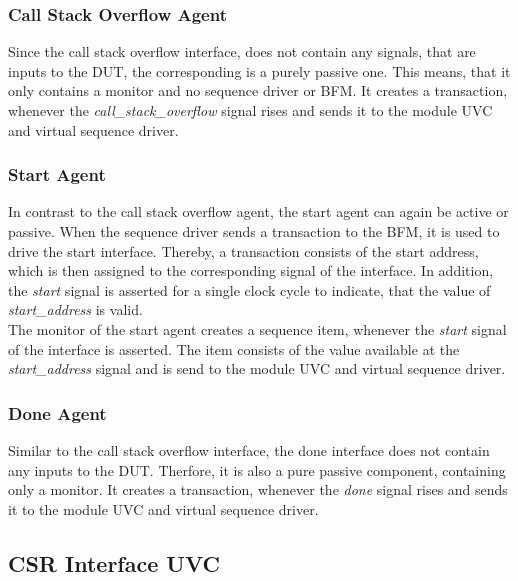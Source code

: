 \subsubsection{Call Stack Overflow Agent}

Since the call stack overflow interface, does not contain any signals, that are inputs to the DUT, the corresponding is a purely passive one.
This means, that it only contains a monitor and no sequence driver or BFM.
It creates a transaction, whenever the \emph{call\_stack\_overflow} signal rises and sends it to the module UVC and virtual sequence driver.

\subsubsection{Start Agent}

In contrast to the call stack overflow agent, the start agent can again be active or passive.
When the sequence driver sends a transaction to the BFM, it is used to drive the start interface.
Thereby, a transaction consists of the start address, which is then assigned to the corresponding signal of the interface.
In addition, the \emph{start} signal is asserted for a single clock cycle to indicate, that the value of \emph{start\_address} is valid.\\
The monitor of the start agent creates a sequence item, whenever the \emph{start} signal of the interface is asserted.
The item consists of the value available at the \emph{start\_address} signal and is send to the module UVC and virtual sequence driver.

\subsubsection{Done Agent}

Similar to the call stack overflow interface, the done interface does not contain any inputs to the DUT.
Therfore, it is also a pure passive component, containing only a monitor.
It creates a transaction, whenever the \emph{done} signal rises and sends it to the module UVC and virtual sequence driver.

\subsection{CSR Interface UVC}

